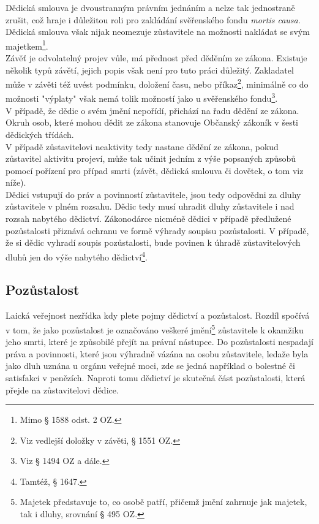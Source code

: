 \documentclass{article}
\begin{document}

Dědická smlouva je dvoustranným právním jednáním a nelze tak jednostraně zrušit, což hraje i důležitou roli pro zakládání svěřenského fondu \textit{mortis causa}. Dědická smlouva však nijak neomezuje zůstavitele na možnosti nakládat se svým majetkem\footnote{Mimo § 1588 odst. 2 OZ.}.\\

Závěť je odvolatelný projev vůle, má přednost před děděním ze zákona. Existuje několik typů závětí, jejich popis však není pro tuto práci důležitý. Zakladatel může v závěti též uvést podmínku, doložení času, nebo příkaz\footnote{Viz vedlejší doložky v závěti, § 1551 OZ.}, minimálně co do možnosti "výplaty" však nemá tolik možností jako u svěřenského fondu\footnote{Viz § 1494 OZ a dále.}.\\

V případě, že dědic o svém jmění nepořídí, přichází na řadu dědění ze zákona. Okruh osob, které mohou dědit ze zákona stanovuje Občanský zákoník v šesti dědických třídách.\\

V případě zůstavitelovi neaktivity tedy nastane dědění ze zákona, pokud zůstavitel aktivitu projeví, může tak učinit jedním z výše popsaných způsobů pomocí pořízení pro případ smrti (závět, dědická smlouva či dovětek, o tom viz níže).\\

Dědici vstupují do práv a povinností zůstavitele, jsou tedy odpovědni za dluhy zůstavitele v plném rozsahu. Dědic tedy musí uhradit dluhy zůstavitele i nad rozsah nabytého dědictví. Zákonodárce nicméně dědici v případě předlužené pozůstalosti přiznává ochranu ve formě výhrady soupisu pozůstalosti. V případě, že si dědic vyhradí soupis pozůstalosti, bude povinen k úhradě zůstavitelových dluhů jen do výše nabytého dědictví\footnote{Tamtéž, § 1647.}.

\subsection{Pozůstalost}

Laická veřejnost nezřídka kdy plete pojmy dědictví a pozůstalost. Rozdíl spočívá v tom, že jako pozůstalost je označováno veškeré jmění\footnote{Majetek představuje to, co osobě patří, přičemž jmění zahrnuje jak majetek, tak i dluhy, srovnání § 495 OZ.} zůstavitele k okamžiku jeho smrti, které je způsobilé přejít na právní nástupce. Do pozůstalosti nespadají práva a povinnosti, které jsou výhradně vázána na osobu zůstavitele, ledaže byla jako dluh uznána u orgánu veřejné moci, zde se jedná například o bolestné či satisfakci v penězích. Naproti tomu dědictví je skutečná část pozůstalosti, která přejde na zůstavitelovi dědice.\\
\end{document}
